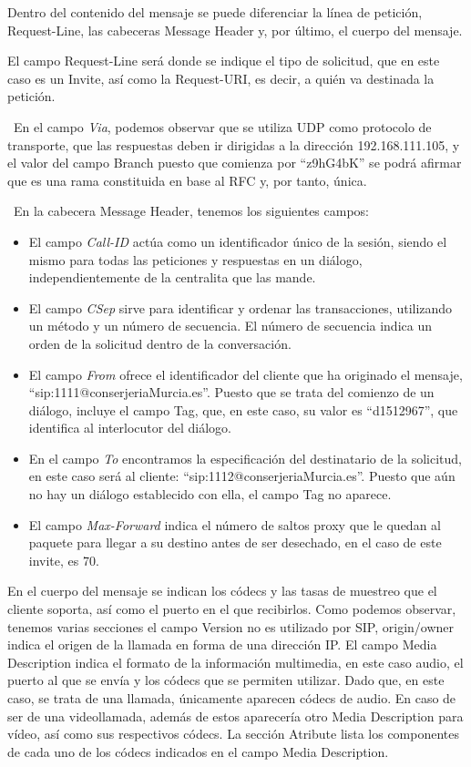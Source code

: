 \documentclass[a4paper]{article}
\begin{document}
\newpage
 Dentro del contenido del mensaje se puede diferenciar la línea de petición, Request-Line, las cabeceras Message Header y, por último, el cuerpo del mensaje.

 El campo Request-Line será donde se indique el tipo de solicitud, que en este caso es un Invite, así como la Request-URI, es decir, a quién va destinada la petición.

\ En el campo \textit{Via}, podemos observar que se utiliza UDP como protocolo de transporte, que las respuestas deben ir dirigidas a la dirección 192.168.111.105, y el valor del campo Branch puesto que comienza por ``z9hG4bK'' se podrá afirmar que es una rama constituida en base al RFC y, por tanto, única.


\ En la cabecera Message Header, tenemos los siguientes campos: 
\begin{itemize}
    \item  El campo \textit{Call-ID} actúa como un identificador único de la sesión, siendo el mismo para todas las peticiones y respuestas en un diálogo, independientemente de la centralita que las mande.
    \item El campo \textit{CSep} sirve para identificar y ordenar las transacciones, utilizando un método y un número de secuencia. El número de secuencia indica un orden de la solicitud dentro de la conversación.
    \item El campo \textit{From} ofrece el identificador del cliente que ha originado el mensaje, ``sip:1111@conserjeriaMurcia.es''. Puesto que
se trata del comienzo de un diálogo, incluye el campo Tag, que, en este caso, su valor es ``d1512967'', que identifica al interlocutor del diálogo. 

\item En el campo \textit{To} encontramos la especificación del destinatario de la solicitud, en este caso será al cliente:
``sip:1112@conserjeriaMurcia.es''. Puesto que aún no hay un diálogo establecido con ella, el campo Tag no aparece.
\item El campo \textit{Max-Forward} indica el número de saltos proxy que le quedan al paquete para llegar a su destino antes de ser desechado, en el caso de este invite, es 70.
\end{itemize}

En el cuerpo del mensaje se indican los códecs y las tasas de muestreo que el cliente soporta, así como el puerto en el que recibirlos. Como podemos observar, tenemos varias secciones el campo Version no es utilizado por SIP, origin/owner indica el origen de la llamada en
forma de una dirección IP. El campo Media Description indica el formato de la información multimedia, en este caso audio, el puerto al que se envía y los códecs que se permiten utilizar.  Dado que, en este caso, se trata de una llamada, únicamente aparecen códecs de audio. En caso de ser de una videollamada, además de estos aparecería otro Media Description para vídeo, así como sus respectivos códecs. La sección Atribute lista los componentes de cada uno de los códecs indicados en el campo Media Description.
\end{document}
